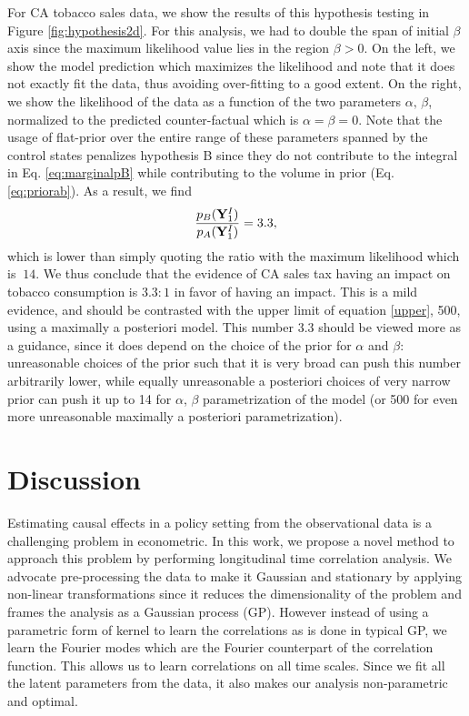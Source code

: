 \documentclass{article}
\def\bY{{\bf Y}}
\begin{document}
For CA tobacco sales data, we show the results of this hypothesis testing in Figure \ref{fig:hypothesis2d}. For this analysis, we had to double the span of initial $\beta$ axis since the maximum likelihood value lies in the region $\beta>0$. On the left, we show the model prediction which maximizes the likelihood and note that it does not exactly fit the data, thus avoiding over-fitting to a good extent. On the right, we show the likelihood of the data as a function of the two parameters $\alpha,\, \beta$, normalized to the predicted counter-factual which is $\alpha=\beta =0$. Note that the usage of flat-prior over the entire range of these parameters spanned by the control states penalizes hypothesis B since they do not contribute to the integral in Eq. \ref{eq:marginalpB} while contributing to the volume in prior (Eq. \ref{eq:priorab}). As a result, we find
\begin{equation}
\frac{p_B(\bY^I_{1})}{p_A(\bY^I_{1})}=3.3,
\label{E}
\end{equation}
which is lower than simply quoting the ratio with the maximum likelihood which is $~14$. We thus conclude that the evidence of CA sales tax having an impact on tobacco consumption is $3.3:1$ in favor of having an impact. This is a mild evidence, and should be contrasted with the upper limit of equation \ref{upper}, 500, using a maximally a posteriori model. This number 3.3 should be viewed
more as a guidance, since it does depend on the 
choice of the prior for $\alpha$ and $\beta$: 
unreasonable choices of the prior such that 
it is very broad can 
push this number arbitrarily lower, while equally unreasonable 
a posteriori choices of very narrow 
prior can push it up to 14 for $\alpha$, 
$\beta$ parametrization of the model (or 500 
for even more unreasonable maximally 
a posteriori parametrization). 

\section{Discussion}
\label{sec:discussion}
Estimating causal effects in a policy setting from the observational data is a challenging problem in econometric. In this work, we propose a novel method to approach this problem by performing longitudinal time correlation analysis. We advocate pre-processing the data to make it Gaussian and stationary by applying non-linear transformations since it reduces the dimensionality of the problem and frames the analysis as a Gaussian process (GP). However instead of using a parametric form of kernel to learn the correlations as is done in typical GP, we learn the Fourier modes which are the Fourier counterpart of the correlation function. This allows us to learn correlations on all time scales. Since we fit all the latent parameters from the data, it also makes our analysis non-parametric and optimal.
\end{document}
